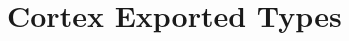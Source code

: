 \hypertarget{group___c_o_r_t_e_x___exported___types}{}\section{Cortex Exported Types}
\label{group___c_o_r_t_e_x___exported___types}
